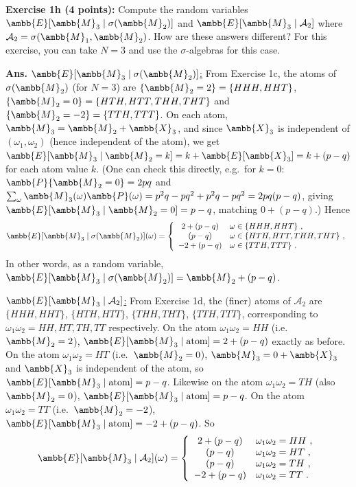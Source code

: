\documentclass[12pt]{article} %
\newcommand{\mE}{\ambb{E}}
\newcommand{\mX}{\ambb{X}}
\newcommand{\mM}{\ambb{M}}
\newcommand{\mP}{\ambb{P}}
\newcommand{\cA}{\mathcal{A}}
\newcommand{\Ans}{\textbf{Ans. }}
\begin{document}
\textbf{Exercise 1h (4 points):} Compute the random variables
$\mE[\mM_3\mid\sigma(\mM_2)]$ and $\mE[\mM_3\mid \cA_2]$ where
$\cA_2 = \sigma(\mM_1,\mM_2)$. How are these answers different? For
this exercise, you can take $N=3$ and use the $\sigma$-algebras for
this case.

\Ans \underline{$\mE[\mM_3\mid \sigma(\mM_2)]$:} From Exercise 1c, the
atoms of $\sigma(\mM_2)$ (for $N=3$) are $\{\mM_2=2\}=\{HHH,HHT\}$,
$\{\mM_2=0\}=\{HTH,HTT,THH,THT\}$ and $\{\mM_2=-2\}=\{TTH,TTT\}$. On
each atom, $\mM_3 = \mM_2 + \mX_3$, and since $\mX_3$ is independent of
$(\omega_1,\omega_2)$ (hence independent of the atom), we get
$\mE[\mM_3 \mid \mM_2=k] = k + \mE[\mX_3] = k+(p-q)$ for each atom
value $k$. (One can check this directly, e.g.\ for $k=0$:
$\mP\{\mM_2=0\}=2pq$ and $\sum_{\omega} \mM_3(\omega)\mP(\omega) =
p^2q - pq^2+p^2q-pq^2 = 2pq(p-q)$, giving $\mE[\mM_3\mid\mM_2=0] =
p-q$, matching $0+(p-q)$.) Hence
\begin{equation}
  \mE[\mM_3\mid\sigma(\mM_2)](\omega) = \left\{\begin{array}{cl} 2+(p-q) & \omega \in \{HHH,HHT\}\ ,\\ (p-q) & \omega \in \{HTH,HTT,THH,THT\}\ ,\\ -2+(p-q) & \omega \in \{TTH,TTT\}\ . \end{array}\right.
\end{equation}
In other words, as a random variable, $\mE[\mM_3\mid\sigma(\mM_2)] =
\mM_2 + (p-q)$.

\underline{$\mE[\mM_3\mid \cA_2]$:} From Exercise 1d, the (finer)
atoms of $\cA_2$ are $\{HHH,HHT\}$, $\{HTH,HTT\}$, $\{THH,THT\}$,
$\{TTH,TTT\}$, corresponding to $\omega_1\omega_2 = HH,HT,TH,TT$
respectively. On the atom $\omega_1\omega_2=HH$ (i.e.\ $\mM_2=2$),
$\mE[\mM_3\mid\text{atom}] = 2+(p-q)$ exactly as before. On the atom
$\omega_1\omega_2=HT$ (i.e.\ $\mM_2=0$), $\mM_3 = 0+\mX_3$ and $\mX_3$
is independent of the atom, so $\mE[\mM_3\mid \text{atom}] = p-q$.
Likewise on the atom $\omega_1\omega_2 = TH$ (also $\mM_2=0$),
$\mE[\mM_3\mid\text{atom}]=p-q$. On the atom $\omega_1\omega_2=TT$
(i.e.\ $\mM_2=-2$), $\mE[\mM_3\mid\text{atom}] = -2+(p-q)$. So
\begin{equation}
  \mE[\mM_3\mid\cA_2](\omega) = \left\{\begin{array}{cl} 2+(p-q) & \omega_1\omega_2 = HH\ ,\\ (p-q) & \omega_1\omega_2 = HT\ ,\\ (p-q) & \omega_1\omega_2 = TH\ ,\\ -2+(p-q) & \omega_1\omega_2 = TT\ . \end{array}\right.
\end{equation}
\end{document}
